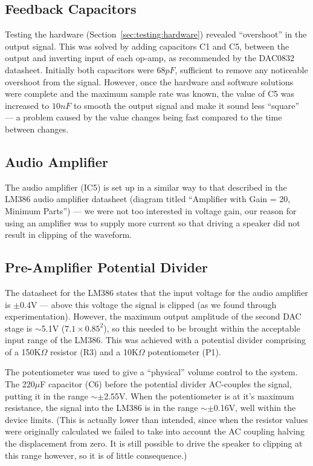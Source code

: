 \subsection{Feedback Capacitors}
\label{sec:design:hardware:feedback}

Testing the hardware (Section~\ref{sec:testing:hardware}) revealed ``overshoot'' in the output 
signal.  This was solved by adding capacitors C1 and C5, between the output and inverting input of 
each op-amp, as recommended by the DAC0832 datasheet\cite{dac0832}.  Initially both capacitors were 
$68pF$, sufficient to remove any noticeable overshoot from the signal.  However, once the hardware 
and software solutions were complete and the maximum sample rate was known, the value of C5 was 
increased to $10nF$ to smooth the output signal and make it sound less ``square'' --- a problem 
caused by the value changes being fast compared to the time between changes.

\subsection{Audio Amplifier}

The audio amplifier (IC5) is set up in a similar way to that described in the LM386 audio amplifier 
datasheet\cite{lm386} (diagram titled ``Amplifier with Gain = 20, Minimum Parts'') --- we were not 
too interested in voltage gain, our reason for using an amplifier was to supply more current so that 
driving a speaker did not result in clipping of the waveform.

\subsection{Pre-Amplifier Potential Divider}

The datasheet for the LM386\cite{lm386} states that the input voltage for the audio amplifier is 
$\pm$0.4V --- above this voltage the signal is clipped (as we found through experimentation).  
However, the maximum output amplitude of the second DAC stage is $\sim$5.1V ($7.1\times0.85^2$), so 
this needed to be brought within the acceptable input range of the LM386.  This was achieved with a 
potential divider comprising of a 150K$\Omega$ resistor (R3) and a 10K$\Omega$ potentiometer (P1).  

The potentiometer was used to give a ``physical'' volume control to the system.  The 220$\mu$F 
capacitor (C6) before the potential divider AC-couples the signal, putting it in the range 
$\sim\pm$2.55V.  When the potentiometer is at it's maximum resistance, the signal into the LM386 is 
in the range $\sim\pm$0.16V, well within the device limits.  (This is actually lower than intended, 
since when the resistor values were originally calculated we failed to take into account the AC 
coupling halving the displacement from zero.  It is still possible to drive the speaker to clipping 
at this range however, so it is of little consequence.)


